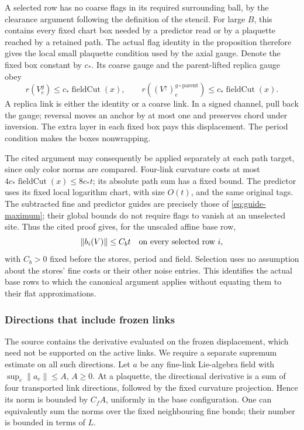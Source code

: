 A selected row has no coarse flags in its required surrounding ball,
by the clearance argument following the definition of the stencil.
For large $B$, this contains every fixed chart box needed by a predictor
read or by a plaquette reached by a retained path. The actual flag
identity in the proposition therefore gives the local small plaquette
condition used by the axial gauge. Denote the fixed box constant by
$c_*$. Its coarse gauge and the parent-lifted replica gauge obey
\begin{equation}\label{eq:global-selected-gauge}
 r(V^g_e)\le c_*\operatorname{fieldCut}(x),\qquad
 r((V^\uparrow)^{g\circ\mathrm{parent}}_e)
                          \le c_*\operatorname{fieldCut}(x).
\end{equation}
A replica link is either the identity or a coarse link. In a signed
channel, pull back the gauge; reversal moves an anchor by at most one
and preserves chord under inversion. The extra layer in each fixed box
pays this displacement. The period condition makes the boxes nonwrapping.

The cited argument may consequently be applied separately at each path
target, since only color norms are compared. Four-link curvature costs
at most $4c_*\operatorname{fieldCut}(x)\le8c_*t$; its absolute path sum
has a fixed bound. The predictor uses its fixed local logarithm chart,
with size $O(t)$, and the same original tags. The subtracted fine and
predictor guides are precisely those of \eqref{eq:guide-maximum};
their global bounds do not require flags to vanish at an unselected
site. Thus the cited proof gives, for the unscaled affine base row,
\begin{equation}\label{eq:global-selected-base}
                      \|b_i(V)\|\le C_b t
                      \quad\hbox{on every selected row }i,
\end{equation}
with $C_b>0$ fixed before the stores, period and field. Selection uses
no assumption about the stores' fine costs or their other noise entries.
This identifies the actual base rows to which the canonical argument
applies without equating them to their flat approximations.

\subsubsection{Directions that include frozen links}

The source contains the derivative evaluated on the frozen displacement,
which need not be supported on the active links. We require a separate
supremum estimate on all such directions. Let $a$ be any fine-link
Lie-algebra field with $\sup_e\|a_e\|\le A$, $A\ge0$.
At a plaquette, the directional derivative is a sum of four transported
link directions, followed by the fixed curvature projection. Hence its
norm is bounded by $C_f A$, uniformly in the base configuration.
One can equivalently sum the norms over the fixed neighbouring fine
bonds; their number is bounded in terms of $L$.

